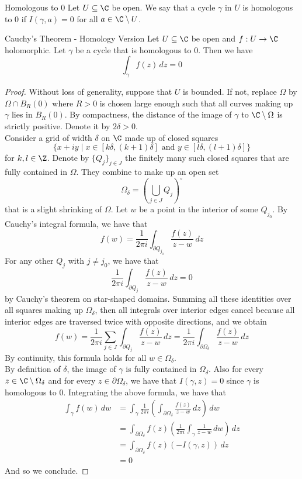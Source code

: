 \documentclass[a4paper]{article}
\begin{document}
\begin{defn}{Homologous to $0$}{} Let $U\subseteq\C$ be open. We say that a cycle $\gamma$ in $U$ is homologous to $0$ if $I(\gamma,a)=0$ for all $a\in\C\setminus U$. 
\end{defn}

\begin{thm}{Cauchy's Theorem - Homology Version}{} Let $U\subseteq\C$ be open and $f:U\to\C$ holomorphic. Let $\gamma$ be a cycle that is homologous to $0$. Then we have $$\int_\gamma f(z)\,dz=0$$ 
\begin{proof}
Without loss of generality, suppose that $U$ is bounded. If not, replace $\Omega$ by $\Omega\cap B_R(0)$ where $R>0$ is chosen large enough such that all curves making up $\gamma$ lies in $B_R(0)$. By compactness, the distance of the image of $\gamma$ to $\C\setminus\Omega$ is strictly positive. Denote it by $2\delta>0$. \\

Consider a grid of width $\delta$ on $\C$ made up of closed squares $$\{x+iy\;|\;x\in[k\delta,(k+1)\delta]\text{ and }y\in[l\delta,(l+1)\delta]\}$$ for $k,l\in\Z$. Denote by $\{Q_j\}_{j\in J}$ the finitely many such closed squares that are fully contained in $\Omega$. They combine to make up an open set $$\Omega_\delta=\left(\bigcup_{j\in J}Q_j\right)^\circ$$ that is a slight shrinking of $\Omega$. Let $w$ be a point in the interior of some $Q_{j_0}$. By Cauchy's integral formula, we have that $$f(w)=\frac{1}{2\pi i}\int_{\partial Q_{j_0}}\frac{f(z)}{z-w}\,dz$$ For any other $Q_j$ with $j\neq j_0$, we have that $$\frac{1}{2\pi i}\int_{\partial Q_j}\frac{f(z)}{z-w}\,dz=0$$ by Cauchy's theorem on star-shaped domains. Summing all these identities over all squares making up $\Omega_\delta$, then all integrals over interior edges cancel because all interior edges are traversed twice with opposite directions, and we obtain $$f(w)=\frac{1}{2\pi i}\sum_{j\in J}\int_{\partial Q_j}\frac{f(z)}{z-w}\,dz=\frac{1}{2\pi i}\int_{\partial \Omega_\delta}\frac{f(z)}{z-w}\,dz$$ By continuity, this formula holds for all $w\in\Omega_\delta$. \\

By definition of $\delta$, the image of $\gamma$ is fully contained in $\Omega_\delta$. Also for every $z\in\C\setminus\Omega_\delta$ and for every $z\in\partial\Omega_\delta$, we have that $I(\gamma,z)=0$ since $\gamma$ is homologous to $0$. Integrating the above formula, we have that 
\begin{align*}
\int_\gamma f(w)\,dw&=\int_{\gamma}\frac{1}{2\pi i}\left(\int_{\partial\Omega_\delta}\frac{f(z)}{z-w}\,dz\right)\,dw\\
&=\int_{\partial\Omega_\delta}f(z)\left(\frac{1}{2\pi i}\int_\gamma\frac{1}{z-w}\,dw\right)\,dz\\
&=\int_{\partial\Omega_\delta}f(z)(-I(\gamma,z))\,dz\\
&=0
\end{align*}
And so we conclude. 
\end{proof}
\end{thm}
\end{document}
